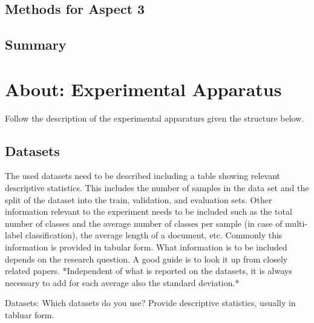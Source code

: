 \documentclass[manuscript, nonacm]{acmart}
\begin{document}
\subsection{Methods for Aspect 3}




\subsection{Summary}

\section{About: Experimental Apparatus}
\label{sec:experimentalapparatus}

Follow the description of the experimental apparaturs given the structure below.



\subsection{Datasets}
\label{sec:datasets}

\begin{tcolorbox}
    [title=Dataset: What needs to be included in the description?]
    The used datasets need to be described including a table showing relevant descriptive statistics. 
    This includes the number of samples in the data set and the split of the dataset into the train, validation, and evaluation sets. Other information relevant to the experiment needs to be included such as the total number of classes and the average number of classes per sample (in case of multi-label classification), the average length of a document, etc. Commonly this information is provided in tabular form. 
    What information is to be included depends on the research question. 
    A good guide is to look it up from closely related papers. *Independent of what is reported on the datasets, it is always necessary to add for each average also the standard deviation.* 
\end{tcolorbox}

Datasets: Which datasets do you use?
Provide descriptive statistics, usually in tabluar form.

\end{document}
